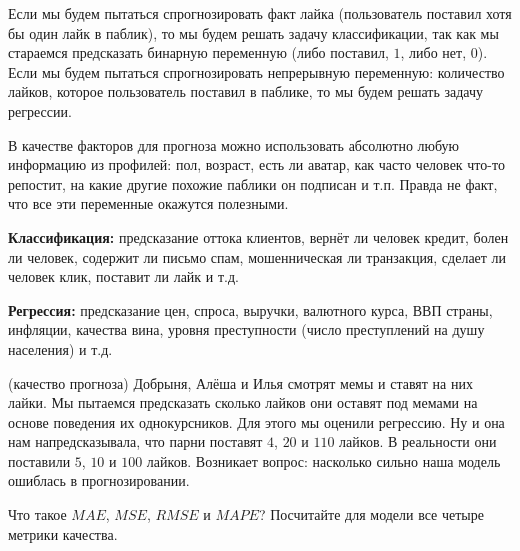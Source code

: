 \documentclass[12pt, a4paper, oneside]{article}
\theoremstyle{plain} %
\theoremstyle{definition}
\newcommand{\indef}[1]{\textbf{ \color{green} #1}}
\begin{document}
\begin{solution}
Если мы будем пытаться спрогнозировать факт лайка (пользователь поставил хотя бы один лайк в паблик), то мы будем решать задачу классификации, так как мы стараемся предсказать бинарную переменную (либо поставил, $1$, либо нет, $0$). Если мы будем пытаться спрогнозировать непрерывную переменную: количество лайков, которое пользователь поставил в паблике, то мы будем решать задачу регрессии. 

В качестве факторов для прогноза можно использовать абсолютно любую информацию из профилей: пол, возраст, есть ли аватар, как часто человек что-то репостит, на какие другие похожие паблики он подписан и т.п.  Правда не факт, что все эти переменные окажутся полезными. 

\indef{Классификация:} предсказание оттока клиентов, вернёт ли человек кредит, болен ли человек, содержит ли письмо спам, мошенническая ли транзакция,  сделает ли человек клик,  поставит ли лайк и т.д.

\indef{Регрессия:} предсказание цен, спроса, выручки, валютного курса,  ВВП страны, инфляции, качества вина, уровня преступности (число преступлений на душу населения) и т.д.
\end{solution}


\begin{problem}{(качество прогноза)}
Добрыня, Алёша и Илья смотрят мемы и ставят на них лайки. Мы пытаемся предсказать сколько лайков они оставят под мемами на основе поведения их однокурсников. Для этого мы оценили регрессию. Ну и она нам напредсказывала, что парни поставят $4$, $20$ и $110$ лайков. В реальности они поставили $5$, $10$ и $100$ лайков. Возникает вопрос: насколько сильно наша модель ошиблась в прогнозировании. 

Что такое $MAE$, $MSE$, $RMSE$ и $MAPE$?  Посчитайте для модели все четыре метрики качества.
\end{problem}
\end{document}
